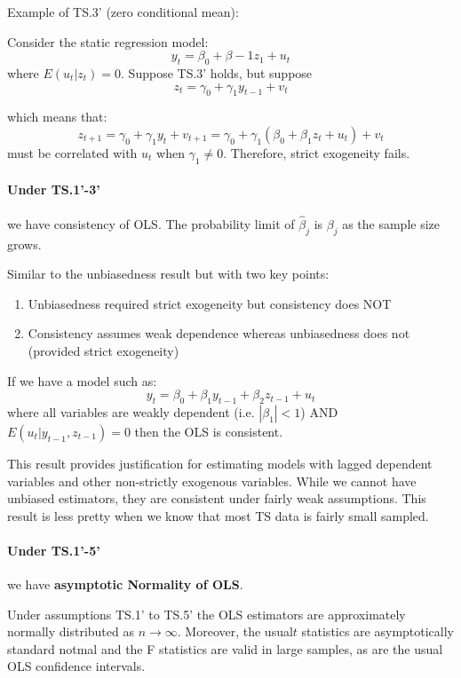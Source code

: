 \documentclass[11pt]{article}
\begin{document}
Example of TS.3' (zero conditional mean):
\begin{mdframed}
    Consider the static regression model:
    \[y_t = \beta_0 + \beta-1 z_1 + u_t\]
    where $E(u_t|z_t) = 0$. Suppose TS.3' holds, but suppose
    \[z_t = \gamma_0 + \gamma_1 y_{t-1} + v_t\]

    which means that:
    \[z_{t+1} = \gamma_0 + \gamma_1 y_t + v_{t+1} = \gamma_0 + \gamma_1(\beta_0 + \beta_1 z_t + u_t) + v_t\]
    must be correlated with $u_t$ when $\gamma_1 \neq 0$. Therefore, strict exogeneity fails.
\end{mdframed}



\paragraph{Under TS.1'-3'} we have consistency of OLS. The probability limit of $\hat{\beta}_j$ is $\beta_j$ as the sample size grows. 

Similar to the unbiasedness result but with two key points:
\begin{enumerate}
    \item Unbiasedness required strict exogeneity but consistency does NOT
    \item Consistency assumes weak dependence whereas unbiasedness does not (provided strict exogeneity)
\end{enumerate}

If we have a model such as:
\[y_t = \beta_0 + \beta_1 y_{t-1} + \beta_2 z_{t-1} + u_t\]
where all variables are weakly dependent (i.e. $|\beta_1|<1$) AND $E(u_t|y_{t-1}, z_{t-1}) = 0$ then the OLS is consistent.

This result provides justification for estimating models with lagged dependent variables and other non-strictly exogenous variables. While we cannot have unbiased estimators, they are consistent under fairly weak assumptions. This result is less pretty when we know that most TS data is fairly small sampled.

\paragraph{Under TS.1'-5'} we have \textbf{asymptotic Normality of OLS}.
\begin{theorem}
    Under assumptions TS.1' to TS.5' the OLS estimators are approximately normally distributed as $n\rightarrow\infty$. Moreover, the usual$t$ statistics are asymptotically standard notmal and the F statistics are valid in large samples, as are the usual OLS confidence intervals.
\end{theorem}
\end{document}
